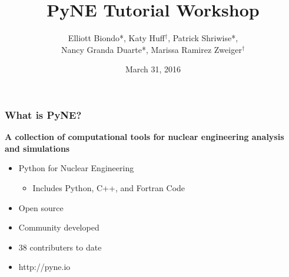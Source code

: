 \documentclass[12pt]{beamer}
\begin{document}
\title{PyNE Tutorial Workshop}   
\author{Elliott Biondo*, Katy Huff$^\dagger$, Patrick Shriwise*, \\ Nancy Granda Duarte*, Marissa Ramirez Zweiger$^\dagger$}
\date{March 31, 2016}
\frame[plain]{\titlepage \addtocounter{framenumber}{-1}} 
\begin{frame}[fragile]
\frametitle{What is PyNE?}

{\bf A collection of computational tools for nuclear engineering analysis and simulations}

\begin{itemize}
\item Python for Nuclear Engineering
\begin{itemize}
\item Includes Python, C++, and Fortran Code
\end{itemize}
\item Open source
\item Community developed
\item 38 contributers to date
\item http://pyne.io
\end{itemize}

\end{frame}
\end{document}
